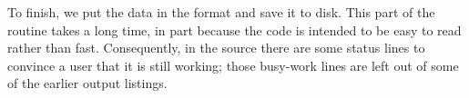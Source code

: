 To finish, we put the data in the  format and save it to 
disk.
This part of the routine takes a long time, in part because
the code is intended to be easy to read rather than fast.
Consequently, in the source there are some status lines to
convince a user that it is still working; 
those busy-work lines are left out of 
some of the earlier output listings.


\endinput


TODO:
1) mention Sage matrices are not mutable in matrix introduction.
Is mutable discussed in Intro?

2) Need int() fcns?  copy() fcn?